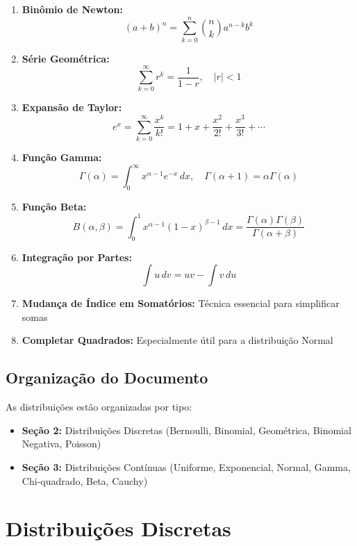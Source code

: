 \documentclass[12pt,a4paper]{article}
\theoremstyle{plain}
\theoremstyle{definition}
\theoremstyle{remark}
\begin{document}
\begin{enumerate}
    \item \textbf{Binômio de Newton:} 
    \[
    (a + b)^n = \sum_{k=0}^n \binom{n}{k} a^{n-k} b^k
    \]
    
    \item \textbf{Série Geométrica:}
    \[
    \sum_{k=0}^{\infty} r^k = \frac{1}{1-r}, \quad |r| < 1
    \]
    
    \item \textbf{Expansão de Taylor:}
    \[
    e^x = \sum_{k=0}^{\infty} \frac{x^k}{k!} = 1 + x + \frac{x^2}{2!} + \frac{x^3}{3!} + \cdots
    \]
    
    \item \textbf{Função Gamma:}
    \[
    \Gamma(\alpha) = \int_0^{\infty} x^{\alpha-1} e^{-x} \, dx, \quad \Gamma(\alpha+1) = \alpha \Gamma(\alpha)
    \]
    
    \item \textbf{Função Beta:}
    \[
    B(\alpha, \beta) = \int_0^1 x^{\alpha-1}(1-x)^{\beta-1} \, dx = \frac{\Gamma(\alpha)\Gamma(\beta)}{\Gamma(\alpha+\beta)}
    \]
    
    \item \textbf{Integração por Partes:}
    \[
    \int u \, dv = uv - \int v \, du
    \]
    
    \item \textbf{Mudança de Índice em Somatórios:} Técnica essencial para simplificar somas
    
    \item \textbf{Completar Quadrados:} Especialmente útil para a distribuição Normal
\end{enumerate}

\subsection{Organização do Documento}

As distribuições estão organizadas por tipo:
\begin{itemize}
    \item \textbf{Seção 2:} Distribuições Discretas (Bernoulli, Binomial, Geométrica, Binomial Negativa, Poisson)
    \item \textbf{Seção 3:} Distribuições Contínuas (Uniforme, Exponencial, Normal, Gamma, Chi-quadrado, Beta, Cauchy)
\end{itemize}

\newpage
\section{Distribuições Discretas}
\end{document}

